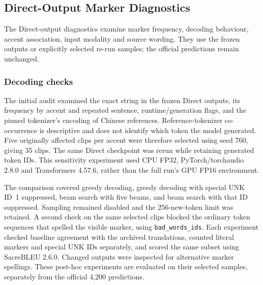 \subsection{Direct-Output Marker Diagnostics}
\label{sec:earlier-diagnostic-method}

The Direct-output diagnostics examine marker frequency, decoding behaviour,
accent association, input modality and source wording. They use the frozen
outputs or explicitly selected re-run samples; the official predictions remain
unchanged.

\subsubsection{Decoding checks}
The initial audit examined the exact string \unk{} in the frozen Direct outputs,
its frequency by accent and repeated sentence, runtime/generation flags, and the
pinned tokenizer's encoding of Chinese references. Reference-tokenizer
co-occurrence is descriptive and does not identify which token the model
generated. Five originally affected clips per accent were therefore selected
using seed 760, giving 35 clips. The same Direct checkpoint was rerun while
retaining generated token IDs. This sensitivity experiment used CPU FP32,
PyTorch/torchaudio 2.8.0 and Transformers 4.57.6, rather than the full run's
GPU FP16 environment.

The comparison covered greedy decoding, greedy decoding with special UNK ID~1
suppressed, beam search with five beams, and beam search with that ID suppressed. Sampling
remained disabled and the 256-new-token limit was retained. A second check on
the same selected clips blocked the ordinary token sequences that spelled the
visible marker, using \texttt{bad\_words\_ids}. Each experiment checked baseline
agreement with the archived translations, counted literal markers and special
UNK IDs separately, and scored the same subset using SacreBLEU 2.6.0. Changed
outputs were inspected for alternative marker spellings. These post-hoc
experiments are evaluated on their selected samples, separately from the
official 4,200 predictions.
